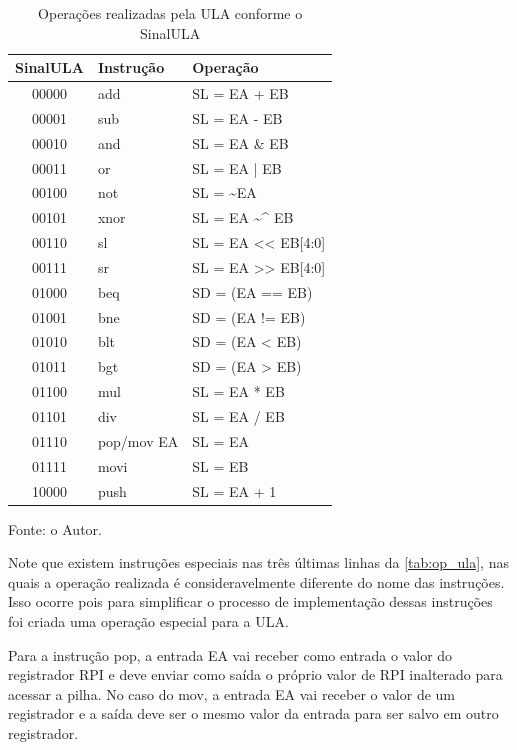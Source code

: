\documentclass[
	12pt,				%
	oneside,
	a4paper,			%
	english,			%
	french,				%
	spanish,			%
	brazil,				%
	]{abntex2}
\begin{document}
\begin{table}[H]
\centering
\caption{Operações realizadas pela ULA conforme o SinalULA}
\label{tab:op_ula}
\begin{tabular}{|c|l|l|}
\hline
\textbf{SinalULA} & \textbf{Instrução} & \textbf{Operação} \\
\hline
00000 & add  & SL = EA + EB \\
00001 & sub  & SL = EA - EB \\
00010 & and  & SL = EA \& EB \\
00011 & or   & SL = EA | EB \\
00100 & not  & SL = \textasciitilde EA \\
00101 & xnor & SL = EA \textasciitilde{}\^{} EB \\
00110 & sl   & SL = EA \textless\textless{} EB[4:0] \\
00111 & sr   & SL = EA \textgreater\textgreater{} EB[4:0] \\
01000 & beq  & SD = (EA == EB) \\
01001 & bne  & SD = (EA != EB) \\
01010 & blt  & SD = (EA < EB) \\
01011 & bgt  & SD = (EA > EB) \\
01100 & mul  & SL = EA * EB \\
01101 & div  & SL = EA / EB \\
01110 & pop/mov EA & SL = EA \\
01111 & movi & SL = EB \\
10000 & push & SL = EA + 1 \\
\hline
\end{tabular}
\vspace{-0.5em}
\begin{center}
Fonte: o Autor.
\end{center}
\end{table}

Note que existem instruções especiais nas três últimas linhas da \autoref{tab:op_ula}, nas quais a operação realizada é consideravelmente diferente do nome das instruções. Isso ocorre pois para simplificar o processo de implementação dessas instruções foi criada uma operação especial para a ULA.

Para a instrução pop, a entrada EA vai receber como entrada o valor do registrador RPI e deve enviar como saída o próprio valor de RPI inalterado para acessar a pilha. No caso do mov, a entrada EA vai receber o valor de um registrador e a saída deve ser o mesmo valor da entrada para ser salvo em outro registrador.
\end{document}
